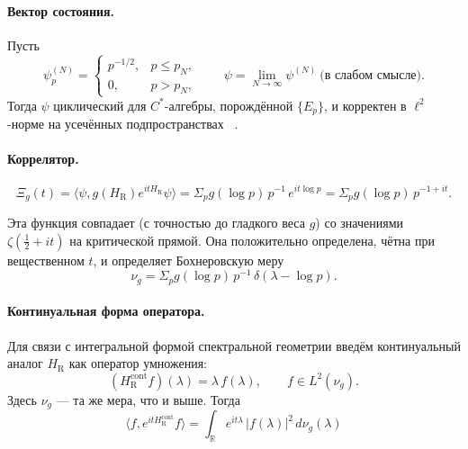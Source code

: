 \documentclass{article}
\numberwithin{equation}{section}
\theoremstyle{plain}
\theoremstyle{definition}
\theoremstyle{remark}
\def\delta{δ}\def\Delta{Δ}\def\epsilon{ε}\def\zeta{ζ}%
\def\infty{∞}\def\partial{∂}\def\sum{Σ}\def\int{∫}%
\begin{document}
\paragraph{Вектор состояния.}
Пусть
\begin{equation}
\psi^{(N)}_p =
\begin{cases}
p^{-1/2}, & p\le p_N,\\
0, & p>p_N,
\end{cases}
\qquad
\psi = \lim_{N\to\infty}\psi^{(N)}
\ \text{(в слабом смысле).}
\end{equation}
Тогда $\psi$ циклический для $C^\ast$-алгебры, порождённой $\{E_p\}$,
и корректен в $\ell^2$-норме на усечённых подпространствах ~\cite{Dixmier1977}.

\paragraph{Коррелятор.}
\begin{equation}
\Xi_g(t)
= \langle\psi, g(H_{\mathrm{R}})e^{itH_{\mathrm{R}}}\psi\rangle
= \sum_{p} g(\log p)\,p^{-1}\,e^{it\log p}
= \sum_p g(\log p)\,p^{-1+it}.
\end{equation}

Эта функция совпадает (с точностью до гладкого веса $g$) со значениями
$\zeta(\tfrac12+it)$ на критической прямой.
Она положительно определена, чётна при вещественном $t$, и определяет
Бохнеровскую меру ~\cite{Titchmarsh1986}
\begin{equation}
\nu_g = \sum_{p} g(\log p)\,p^{-1}\,\delta(\lambda-\log p).
\end{equation}

\paragraph{Континуальная форма оператора.}

Для связи с интегральной формой спектральной геометрии введём
континуальный аналог $H_{\mathrm{R}}$ как оператор умножения:
\begin{equation}
(H_{\mathrm{R}}^{\mathrm{cont}} f)(\lambda) = \lambda\,f(\lambda),
\qquad f\in L^2(\nu_g).
\end{equation}
Здесь $\nu_g$ — та же мера, что и выше.
Тогда
\begin{equation}
\langle f, e^{itH_{\mathrm{R}}^{\mathrm{cont}}}f\rangle
= \int_{\mathbb R} e^{it\lambda}\,|f(\lambda)|^2\,d\nu_g(\lambda)
\label{eq:QSSC0042}
\end{equation}
\end{document}
